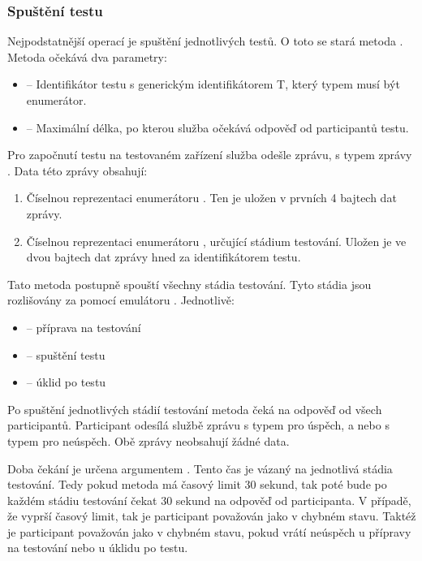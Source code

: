 \subsubsection{Spuštění testu}

Nejpodstatnější operací je spuštění jednotlivých testů. O toto se stará metoda . Metoda očekává dva parametry:

\begin{itemize}
    \item {} -- Identifikátor testu s generickým identifikátorem T, který typem musí být enumerátor.
    \item {} -- Maximální délka, po kterou služba očekává odpověď od participantů testu. 
\end{itemize}

Pro započnutí testu na testovaném zařízení služba odešle zprávu, s typem zprávy . Data této zprávy obsahují:

\begin{enumerate}
    \item Číselnou reprezentaci enumerátoru . Ten je uložen v prvních 4 bajtech dat zprávy.
    \item Číselnou reprezentaci enumerátoru , určující stádium testování. Uložen je ve dvou bajtech dat zprávy hned za identifikátorem testu.
\end{enumerate}

Tato metoda postupně spouští všechny stádia testování. Tyto stádia jsou rozlišovány za pomocí emulátoru . Jednotlivě:

\begin{itemize}
    \item {} -- příprava na testování
    \item {} -- spuštění testu
    \item {} -- úklid po testu
\end{itemize}

Po spuštění jednotlivých stádií testování metoda čeká na odpověď od všech participantů. Participant odesílá službě zprávu s typem  pro úspěch, a nebo s typem  pro neúspěch. Obě zprávy neobsahují žádné data.

Doba čekání je určena argumentem . Tento čas je vázaný na jednotlivá stádia testování. Tedy pokud metoda má časový limit 30 sekund, tak poté bude po každém stádiu testování čekat 30 sekund na odpověď od participanta. V případě, že vyprší časový limit, tak je participant považován jako v chybném stavu. Taktéž je participant považován jako v chybném stavu, pokud vrátí neúspěch u přípravy na testování nebo u úklidu po testu.

